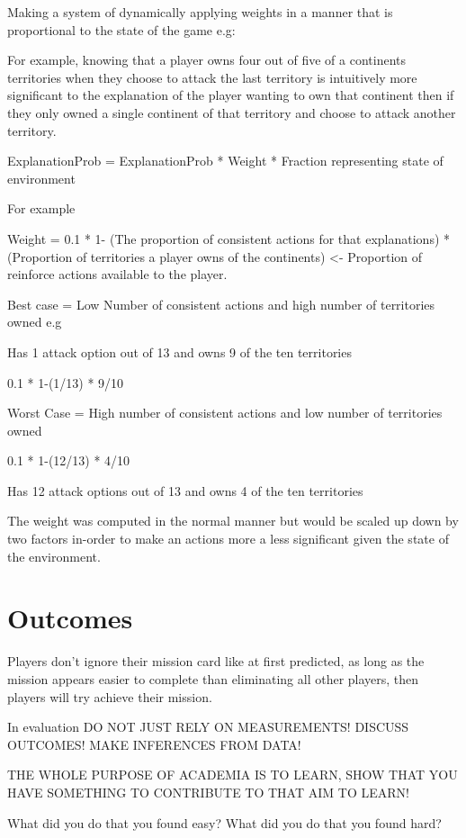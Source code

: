 \documentclass[parskip]{cs4rep}
\begin{document}
Making a system of dynamically applying weights in a manner that is proportional to the state of the game e.g:

For example, knowing that a player owns four out of five of a continents territories when they choose to attack the last territory is intuitively more significant to the explanation of the player wanting to own that continent then if they only owned a single continent of that territory and choose to attack another territory.

ExplanationProb = ExplanationProb * Weight * Fraction representing state of environment

For example

Weight = 0.1 * 1- (The proportion of consistent actions for that explanations) * (Proportion of territories a player owns of the continents) <- Proportion of reinforce actions available to the player.

Best case = Low Number of consistent actions and high number of territories owned e.g

Has 1 attack option out of 13 and owns 9 of the ten territories

0.1 * 1-(1/13) * 9/10 

Worst Case = High number of consistent actions and low number of territories owned

0.1 * 1-(12/13) * 4/10 

Has 12 attack options out of 13 and owns 4 of the ten territories

The weight was computed in the normal manner but would be scaled up down by two factors in-order to make an actions more a less significant given the state of the environment.

\section{Outcomes}

Players don't ignore their mission card like at first predicted, as long as the mission appears easier to complete than eliminating all other players, then players will try achieve their mission.

In evaluation DO NOT JUST RELY ON MEASUREMENTS! DISCUSS OUTCOMES! MAKE INFERENCES FROM DATA!

THE WHOLE PURPOSE OF ACADEMIA IS TO LEARN, SHOW THAT YOU HAVE SOMETHING TO CONTRIBUTE TO THAT AIM TO LEARN!

What did you do that you found easy? What did you do that you found hard? 
\end{document}
